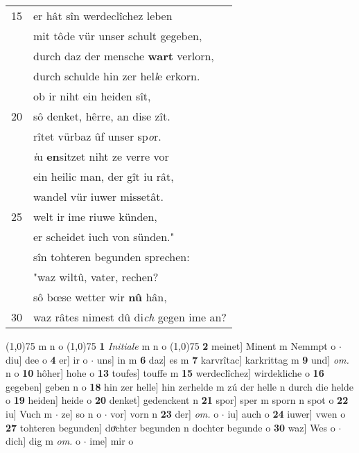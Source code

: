 \documentclass[8pt,a4paper,notitlepage]{article}
\begin{document}
\begin{table}[ht]
\begin{minipage}[t]{0.5\linewidth}
\begin{tabular}{rl}
15 & er hât sîn werdeclîchez leben\\ 
 & mit tôde vür unser schult gegeben,\\ 
 & durch daz der mensche \textbf{wart} verlorn,\\ 
 & durch schulde hin zer hel\textit{l}e erkorn.\\ 
 & ob ir niht ein heiden sît,\\ 
20 & sô denket, hêrre, an dise zît.\\ 
 & rîtet vürbaz ûf unser sp\textit{o}r.\\ 
 & \textit{i}u \textbf{en}sitzet niht ze verre vor\\ 
 & ein heilic man, der gît iu rât,\\ 
 & wandel vür iuwer missetât.\\ 
25 & welt ir ime riuwe künden,\\ 
 & er scheidet iuch von sünden."\\ 
 & sîn tohteren begunden sprechen:\\ 
 & "waz wiltû, vater, rechen?\\ 
 & sô bœse wetter wir \textbf{nû} hân,\\ 
30 & waz râtes nimest dû di\textit{ch} gegen ime an?\\ 
\end{tabular}
\scriptsize
\line(1,0){75} \newline
m n o \newline
\line(1,0){75} \newline
\textbf{1} \textit{Initiale} m n o  \newline
\line(1,0){75} \newline
\textbf{2} meinet] Minent m Nemmpt o  $\cdot$ diu] dee o \textbf{4} er] ir o  $\cdot$ uns] in m \textbf{6} daz] es m \textbf{7} karvrîtac] karkrittag m \textbf{9} und] \textit{om.} n o \textbf{10} hôher] hohe o \textbf{13} toufes] touffe m \textbf{15} werdeclîchez] wirdekliche o \textbf{16} gegeben] geben n o \textbf{18} hin zer helle] hin zerhelde m zú der helle n durch die helde o \textbf{19} heiden] heide o \textbf{20} denket] gedenckent n \textbf{21} spor] sper m sporn n spot o \textbf{22} iu] Vuch m  $\cdot$ ze] so n o  $\cdot$ vor] vorn n \textbf{23} der] \textit{om.} o  $\cdot$ iu] auch o \textbf{24} iuwer] vwen o \textbf{27} tohteren begunden] doͯchter begunden n dochter begunde o \textbf{30} waz] Wes o  $\cdot$ dich] dig m \textit{om.} o  $\cdot$ ime] mir o \newline
\end{minipage}
\end{table}
\end{document}
